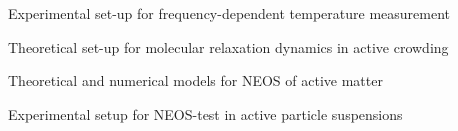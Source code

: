 \begin{workpackage}
\begin{wpdelivs}
\begin{wpdeliv}[due=12,id=D2.3,dissem=PU,nature=DEM,lead=Leipzig]
      {Experimental set-up for frequency-dependent temperature measurement}
  \end{wpdeliv}
  \begin{wpdeliv}[due=24,id=D2.1,dissem=PU,nature=DEM,lead=Leipzig]
      {Theoretical set-up for molecular relaxation dynamics in active crowding}
  \end{wpdeliv}
  \begin{wpdeliv}[due=24,id=D2.2,dissem=PU,nature=DEM,lead=Leipzig]
      {Theoretical and numerical models for NEOS of active matter}
\end{wpdeliv}
  \begin{wpdeliv}[due=36,id=D2.4,dissem=PU,nature=DEM,lead=Leipzig]
      {Experimental setup for NEOS-test in active particle suspensions}
\end{wpdeliv}
\end{wpdelivs}

\end{workpackage}

